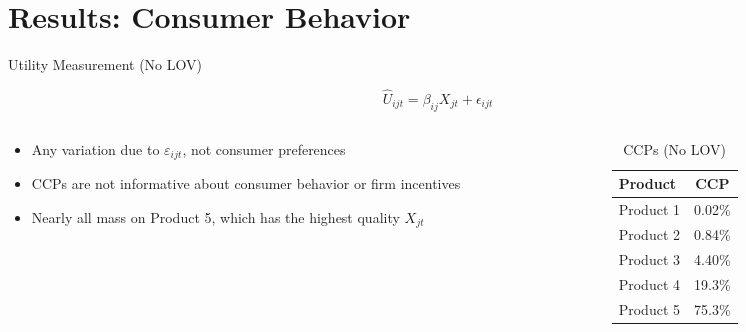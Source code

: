 \documentclass[aspectratio=169,professionalfonts]{beamer}
\begin{document}
\section{Results: Consumer Behavior}

\begin{frame}{Utility Measurement (No LOV)}
  \begin{tcolorbox}[colback=red!5!white, colframe=UGARed, title=\textbf{Utility Function without LOV}]
    \begin{equation*}
      \hat{U}_{ijt} = \beta_{ij} X_{jt} + \epsilon_{ijt}
    \end{equation*}
  \end{tcolorbox}
  \begin{columns}[T]
    \begin{column}{0.5\textwidth}
      
      \begin{itemize}
        \item Any variation due to $\varepsilon_{ijt}$, not consumer preferences
        \item CCPs are not informative about consumer behavior or firm incentives
        \item Nearly all mass on Product 5, which has the highest quality $X_{jt}$
      \end{itemize}
    \end{column}
    \begin{column}{0.47\textwidth}
      \begin{table}
        \caption{CCPs (No LOV)}
        \begin{tabular}{lc}
          \toprule
          Product & CCP \\
          \midrule
          Product 1     & 0.02\% \\
          Product 2     & 0.84\% \\
          Product 3     & 4.40\% \\
          Product 4     & 19.3\% \\
          Product 5     & 75.3\% \\
          \bottomrule
        \end{tabular}
      \end{table}
    \end{column}
  \end{columns}
\end{frame}
\end{document}
